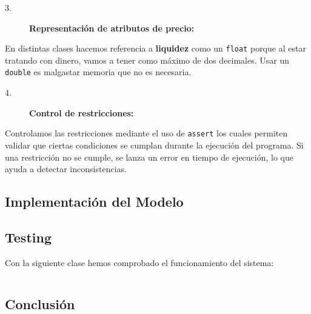 \begin{description}
    \item[3.] \textbf{Representación de atributos de precio:}
\end{description}
En distintas clases hacemos referencia a \textbf{liquidez} como un \texttt{float} porque al estar tratando con dinero, vamos a tener como máximo de dos decimales. Usar un \texttt{double} es malgastar  memoria que no es necesaria.
\vspace{0.20cm}

\begin{description}
    \item[4.] \textbf{Control de restricciones:}
\end{description}
Controlamos las restricciones mediante el uso de \texttt{assert} los cuales permiten validar que ciertas condiciones se cumplan durante la ejecución del programa. Si una restricción no se cumple, se lanza un error en tiempo de ejecución, lo que ayuda a detectar inconsistencias.


\newpage



\subsection{Implementación del Modelo}


\subsection{Testing}
Con la siguiente clase hemos comprobado el funcionamiento del sistema:
\begin{lstlisting}[style = javaNormal, language=Java] 

\end{lstlisting}

\subsection{Conclusión}

